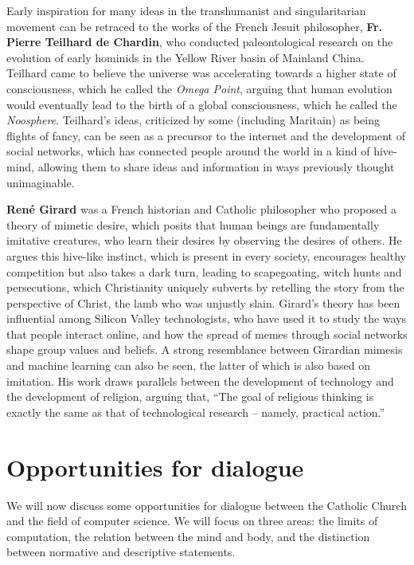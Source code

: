 \documentclass[sigplan,nonacm]{acmart}\settopmatter{printfolios=false,printccs=false,printacmref=false}
\begin{document}
Early inspiration for many ideas in the transhumanist and singularitarian movement can be retraced to the works of the French Jesuit philosopher, \textbf{Fr. Pierre Teilhard de Chardin}, who conducted paleontological research on the evolution of early hominids in the Yellow River basin of Mainland China. Teilhard came to believe the universe was accelerating towards a higher state of consciousness, which he called the \textit{Omega Point}, arguing that human evolution would eventually lead to the birth of a global consciousness, which he called the \textit{Noosphere}. Teilhard's ideas, criticized by some (including Maritain) as being flights of fancy, can be seen as a precursor to the internet and the development of social networks, which has connected people around the world in a kind of hive-mind, allowing them to share ideas and information in ways previously thought unimaginable.

\textbf{Ren\'e Girard} was a French historian and Catholic philosopher who proposed a theory of mimetic desire, which posits that human beings are fundamentally imitative creatures, who learn their desires by observing the desires of others. He argues this hive-like instinct, which is present in every society, encourages healthy competition but also takes a dark turn, leading to scapegoating, witch hunts and persecutions, which Christianity uniquely subverts by retelling the story from the perspective of Christ, the lamb who was unjustly slain. Girard's theory has been influential among Silicon Valley technologists, who have used it to study the ways that people interact online, and how the spread of memes through social networks shape group values and beliefs. A strong resemblance between Girardian mimesis and machine learning can also be seen, the latter of which is also based on imitation. His work draws parallels between the development of technology and the development of religion, arguing that, ``The goal of religious thinking is exactly the same as that of technological research -- namely, practical action.''~\cite{girard1977violence}

\clearpage

\section{Opportunities for dialogue}

We will now discuss some opportunities for dialogue between the Catholic Church and the field of computer science. We will focus on three areas: the limits of computation, the relation between the mind and body, and the distinction between normative and descriptive statements.
\end{document}
